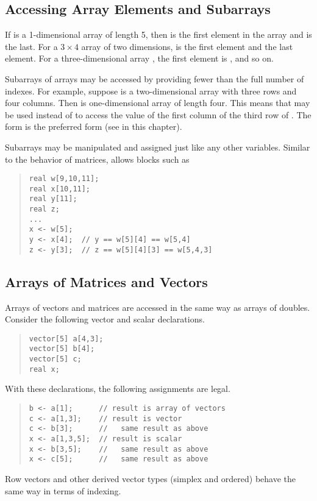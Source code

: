 \subsection{Accessing Array Elements and Subarrays}

If  is a 1-dimensional array of length 5, then  is
the first element in the array and  is the last.  For a $3
\times 4$ array  of two dimensions,  is the first
element and  the last element.  For a three-dimensional
array , the first element is , and so on.

Subarrays of arrays may be accessed by providing fewer than the full
number of indexes.  For example, suppose  is a two-dimensional
array with three rows and four columns.  Then  is
one-dimensional array of length four.  This means that 
may be used instead of  to access the value of the first
column of the third row of .  The form  is the
preferred form (see  in this chapter).

Subarrays may be manipulated and assigned just like any other
variables.  Similar to the behavior of matrices, \Stan allows blocks
such as 
%
\begin{quote}
\begin{Verbatim} 
real w[9,10,11];
real x[10,11];
real y[11];
real z;
...
x <- w[5];
y <- x[4];  // y == w[5][4] == w[5,4]
z <- y[3];  // z == w[5][4][3] == w[5,4,3]
\end{Verbatim}
\end{quote}
%


\subsection{Arrays of Matrices and Vectors}

Arrays of vectors and matrices are accessed in the same way as arrays
of doubles.  Consider the following vector and scalar declarations.
%
\begin{quote}
\begin{Verbatim}[fontsize=\small]
vector[5] a[4,3];
vector[5] b[4];
vector[5] c;
real x;
\end{Verbatim}
\end{quote}
%
With these declarations, the following assignments are legal.
%
\begin{quote}
\begin{Verbatim}[fontsize=\small]
b <- a[1];      // result is array of vectors
c <- a[1,3];    // result is vector
c <- b[3];      //   same result as above
x <- a[1,3,5];  // result is scalar
x <- b[3,5];    //   same result as above
x <- c[5];      //   same result as above
\end{Verbatim}
\end{quote}
%
Row vectors and other derived vector types (simplex and ordered)
behave the same way in terms of indexing.


